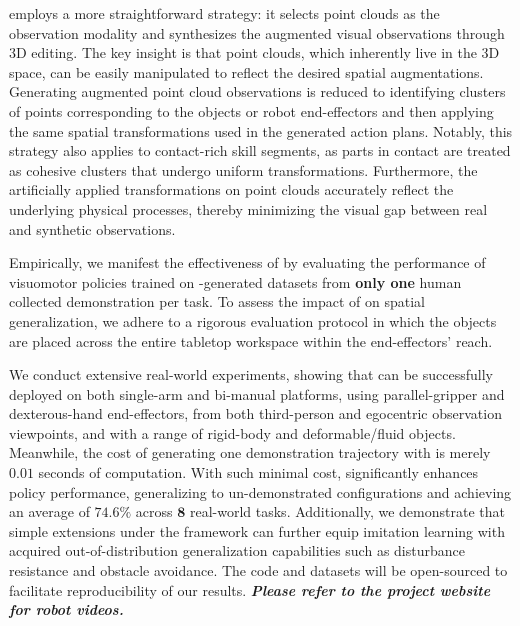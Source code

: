 \method employs a more straightforward strategy: it selects point clouds as the observation modality and synthesizes the augmented visual observations through 3D editing. 
The key insight is that point clouds, which inherently live in the 3D space, can be easily manipulated to reflect the desired spatial augmentations. 
Generating augmented point cloud observations is reduced to identifying clusters of points corresponding to the objects or robot end-effectors and then applying the same spatial transformations used in the generated action plans. 
Notably, this strategy also applies to contact-rich skill segments, as parts in contact are treated as cohesive clusters that undergo uniform transformations. 
Furthermore, the artificially applied transformations on point clouds accurately reflect the underlying physical processes, thereby minimizing the visual gap between real and synthetic observations.

\vspace{0.2cm}
Empirically, we manifest the effectiveness of \method by evaluating the performance of visuomotor policies trained on \method-generated datasets from \textbf{only one} human collected demonstration per task. To assess the impact of \method on spatial generalization, we adhere to a rigorous evaluation protocol in which the objects are placed across the entire tabletop workspace within the end-effectors' reach.

We conduct extensive real-world experiments, showing that \method can be successfully deployed on both single-arm and bi-manual platforms, using parallel-gripper and dexterous-hand end-effectors, from both third-person and egocentric observation viewpoints, and with a range of rigid-body and deformable/fluid objects. Meanwhile, the cost of generating one demonstration trajectory with \method is merely $\mathbf{0.01}$ seconds of computation. With such minimal cost, \method significantly enhances policy performance, generalizing to un-demonstrated configurations and achieving an average of $\mathbf{74.6}\%$ across $\mathbf{8}$ real-world tasks. Additionally, we demonstrate that simple extensions under the \method framework can further equip imitation learning with acquired out-of-distribution generalization capabilities such as disturbance resistance and obstacle avoidance. The code and datasets will be open-sourced to facilitate reproducibility of our results. \textbf{\textit{Please refer to the project website for robot videos.}}